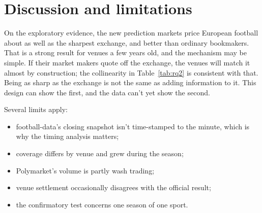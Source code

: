 \documentclass[11pt]{article}
\begin{document}
\begin{center}
\end{center}

\section{Discussion and limitations}

On the exploratory evidence, the new prediction markets price European football about as well
as the sharpest exchange, and better than ordinary bookmakers. That is a strong result for venues
a few years old, and the mechanism may be simple. If their market makers quote off the exchange,
the venues will match it almost by construction; the collinearity in Table~\ref{tab:rq2} is
consistent with that. Being as sharp as the exchange is not the same as adding information to
it. This design can show the first, and the data can't yet show the second.

Several limits apply:
\begin{itemize}
  \item football-data's closing snapshot isn't time-stamped to the minute, which is why the
    timing analysis matters;
  \item coverage differs by venue and grew during the season;
  \item Polymarket's volume is partly wash trading;
  \item venue settlement occasionally disagrees with the official result;
  \item the confirmatory test concerns one season of one sport.
\end{itemize}
\end{document}
